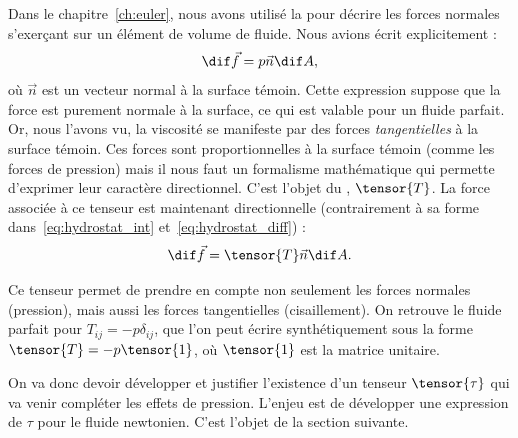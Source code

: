 Dans le chapitre~\ref{ch:euler}, nous avons utilisé la  pour décrire les forces normales s'exerçant sur un élément de volume de fluide. Nous avions écrit explicitement :
\begin{displaymath}
  \dif\vec{f} = p \vec{n} \dif A,
\end{displaymath}
où $\vec{n}$ est un vecteur normal à la surface témoin. Cette expression suppose que la force est purement normale à la surface, ce qui est valable pour un fluide parfait. Or, nous l'avons vu, la viscosité se manifeste par des forces \emph{tangentielles} à la surface témoin. Ces forces sont proportionnelles à la surface témoin (comme les forces de pression) mais il nous faut un formalisme mathématique qui permette d'exprimer leur caractère directionnel. C'est l'objet du , $\tensor{T}$. La force associée à ce tenseur est maintenant directionnelle (contrairement à sa forme dans~\eqref{eq:hydrostat_int} et~\eqref{eq:hydrostat_diff}) :
\begin{displaymath}
  \dif\vec{f} = \tensor{T} \vec{n} \dif A.
\end{displaymath}

Ce tenseur permet de prendre en compte non seulement les forces normales (pression), mais aussi les forces tangentielles (cisaillement). On retrouve le fluide parfait pour $T_{ij} = -p \delta_{ij}$, que l'on peut écrire synthétiquement sous la forme $\tensor{T} = -p \tensor{1}$, où $\tensor{1}$ est la matrice unitaire.

On va donc devoir développer et justifier l'existence d'un tenseur $\tensor{\tau}$ qui va venir compléter les effets de pression. L'enjeu est de développer une expression de $\tau$ pour le fluide newtonien. C'est l'objet de la section suivante.

